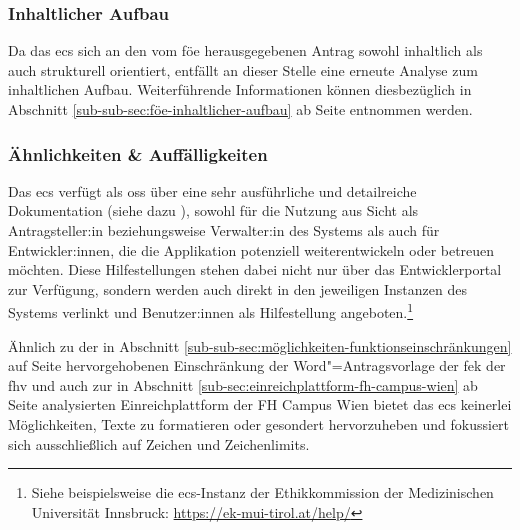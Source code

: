 \documentclass[a4paper,12pt,twoside]{scrreprt}
\begin{document}
\subsubsection*{Inhaltlicher Aufbau}
\label{sub-sub-sec:ecs-inhaltlicher-aufbau}

Da das \ac{ecs} sich an den vom \acl{föe} herausgegebenen Antrag sowohl inhaltlich als auch strukturell orientiert, entfällt an dieser Stelle eine erneute Analyse zum inhaltlichen Aufbau. Weiterführende Informationen können diesbezüglich in Abschnitt \ref{sub-sub-sec:föe-inhaltlicher-aufbau} ab Seite \pageref{sub-sub-sec:föe-inhaltlicher-aufbau} entnommen werden.

\subsubsection*{Ähnlichkeiten \& Auffälligkeiten}
\label{sub-sub-sec:ähnlichkeiten-auffälligkeiten-ecs}

Das \acl{ecs} verfügt als \ac{oss} über eine sehr ausführliche und detailreiche Dokumentation (siehe dazu \cite{medizinische_universitat_wien_ecs-docs_about-2021, medizinische_universitat_wien_development_2021, medizinische_universitat_wien_installationusage_2021, medizinische_universitat_wien_ecs-handbook_development-2021, ethics_commission_system_organization_ecs_2021}), sowohl für die Nutzung aus Sicht als Antragsteller:in beziehungsweise Verwalter:in des Systems als auch für Entwickler:innen, die die Applikation potenziell weiterentwickeln oder betreuen möchten. Diese Hilfestellungen stehen dabei nicht nur über das Entwicklerportal zur Verfügung, sondern werden auch direkt in den jeweiligen Instanzen des Systems verlinkt und Benutzer:innen als Hilfestellung angeboten.\footnote{Siehe beispielsweise die \ac{ecs}-Instanz der Ethikkommission der Medizinischen Universität Innsbruck: \url{https://ek-mui-tirol.at/help/}}

\medskip

Ähnlich zu der in Abschnitt \ref{sub-sub-sec:möglichkeiten-funktionseinschränkungen} auf Seite \pageref{sub-sub-sec:möglichkeiten-funktionseinschränkungen} hervorgehobenen Einschränkung der Word"=Antragsvorlage der \ac{fek} der \ac{fhv} und auch zur in Abschnitt \ref{sub-sec:einreichplattform-fh-campus-wien} ab Seite \pageref{sub-sec:einreichplattform-fh-campus-wien} analysierten Einreichplattform der FH Campus Wien bietet das \acl{ecs} keinerlei Möglichkeiten, Texte zu formatieren oder gesondert hervorzuheben und fokussiert sich ausschließlich auf Zeichen und Zeichenlimits.
\end{document}
